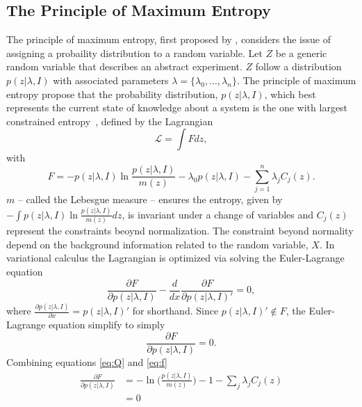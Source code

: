 	\subsection{The Principle of Maximum Entropy}
	\label{sec:maxent}
	The principle of maximum entropy, first proposed by \citet{Jaynes1957}, considers the issue of assigning a probaility distribution to a random variable. Let $Z$ be a generic random variable that describes an abstract experiment. $Z$ follow a distribution $p(z|\lambda, I)$ with associated parameters $\lambda = \{\lambda_0,\dots ,\lambda_n\}$. The principle of maximum entropy propose that the probability distribution, $p(z|\lambda, I)$, which best represents the current state of knowledge about a system is the one with largest constrained entropy~\citep{Sivia2006}, defined by the Lagrangian
	\begin{equation}
		\mathcal{L} = \int F dz,
		\label{eq:Q}
	\end{equation}
	with
	\begin{equation}
		F= -p(z|\lambda, I)\ln\frac{p(z|\lambda, I)}{m(z)}-\lambda_0 p(z|\lambda, I)-\sum_{j=1}^{n}\lambda_jC_j(z).
	\end{equation}
	$m$ -- called the Lebesgue measure -- ensures the entropy, given by $-\int p(z|\lambda, I)\ln\frac{p(z|\lambda, I)}{m(z)} dz$, is invariant under a change of variables and $C_j(z)$ represent the constraints beoynd normalization. The constraint beyond normality depend on the background information related to the random variable, $X$. In variational calculus the Lagrangian is optimized via solving the Euler-Lagrange equation
	\begin{equation}
		\frac{\partial F}{\partial p(z|\lambda, I)}-\frac{d}{dx}\frac{\partial F}{\partial p(z|\lambda, I)'}=0,
	\end{equation}
	where $\frac{\partial p(z|\lambda, I)}{\partial x} = p(z|\lambda, I)'$ for shorthand. Since $p(z|\lambda, I)'\notin F$, the Euler-Lagrange equation simplify to simply
	\begin{equation}
		\frac{\partial F}{\partial p(z|\lambda, I)}=0.
		\label{eq:f}
	\end{equation}
	Combining equations \eqref{eq:Q} and \eqref{eq:f}
	\begin{equation}
		\begin{split}
			\frac{\partial F}{\partial p(z|\lambda, I)}&= -\ln\bigg(\frac{p(z|\lambda, I)}{m(z)}\bigg)-1-\sum_{j}\lambda_{j}C_j(z)\\
			&=0
		\end{split}
	\end{equation}
